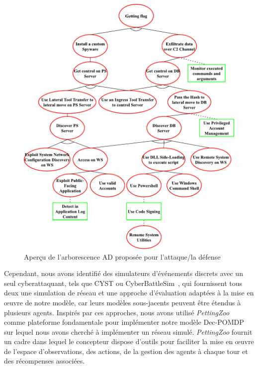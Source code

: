 \begin{figure}
    \centering
    \includegraphics[width=\linewidth]{figures/ADTree.pdf}
    \caption{Aperçu de l'arborescence AD proposée pour l'attaque/la défense}
    \label{fig:ADTree}
\end{figure}

Cependant, nous avons identifié des simulateurs d'événements discrets avec un seul cyberattaquant, tels que CYST\cite{drasar_session-level_2020} ou CyberBattleSim~\cite{cyberbattlesim}, qui fournissent tous deux une simulation de réseau et une approche d'évaluation adaptées à la mise en œuvre de notre modèle, car leurs modèles sous-jacents peuvent être étendus à plusieurs agents. Inspirés par ces approches, nous avons utilisé \textit{PettingZoo}~\cite{jk2020} comme plateforme fondamentale pour implémenter notre modèle Dec-POMDP sur lequel nous avons cherché à implémenter un réseau simulé. \textit{PettingZoo} fournit un cadre dans lequel le concepteur dispose d'outils pour faciliter la mise en œuvre de l'espace d'observations, des actions, de la gestion des agents à chaque tour et des récompenses associées.


